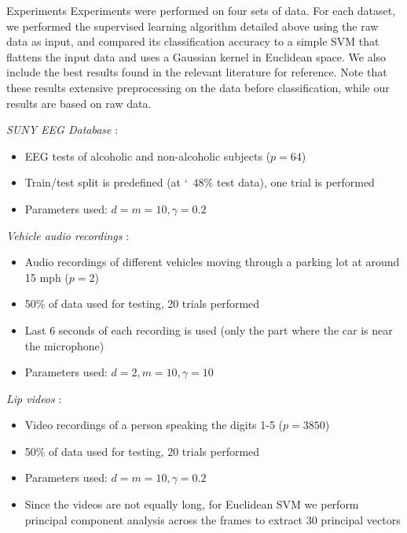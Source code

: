 \documentclass[final]{beamer}
\newlength{\onecolwid}
\newcommand{\lbr}{\vspace{0.5in}}
\begin{document}
\begin{frame}[t]
\begin{columns}[t]
\begin{column}{\onecolwid} %


\begin{block}{Experiments}
    Experiments were performed on four sets of data. For each dataset, we performed the supervised
    learning algorithm detailed above using the raw data as input, and compared its classification
    accuracy to a simple SVM that flattens the input data and uses a Gaussian kernel in Euclidean
    space. We also include the best results found in the relevant literature for reference. Note that these results
    extensive preprocessing on the data before classification, while our results are based on raw data. \lbr

    \textit{SUNY EEG Database} \cite{zhang_event_1995}:
    \begin{itemize}
        \item EEG tests of alcoholic and non-alcoholic subjects ($p = 64$)
        \item Train/test split is predefined (at \char`~48\% test data), one trial is performed
        \item Parameters used: $d = m = 10, \gamma = 0.2$
    \end{itemize}

    \textit{Vehicle audio recordings} \cite{sunu_dimensionality_2018}:
    \begin{itemize}
        \item Audio recordings of different vehicles moving through a parking lot at around 15 mph
            ($p = 2$)
        \item 50\% of data used for testing, 20 trials performed
        \item Last 6 seconds of each recording is used (only the part where the car is near the
            microphone)
        \item Parameters used: $d = 2, m = 10, \gamma = 10$
    \end{itemize}

    \textit{Lip videos} \cite{lieu_signal_2011}:
    \begin{itemize}
        \item Video recordings of a person speaking the digits 1-5 ($p = 3850$)
        \item 50\% of data used for testing, 20 trials performed
        \item Parameters used: $d = m = 10, \gamma = 0.2$
        \item Since the videos are not equally long, for Euclidean SVM we perform principal
            component analysis across the frames to extract 30 principal vectors
    \end{itemize}
\end{block}


\end{column}
\end{columns}
\end{frame}
\end{document}
